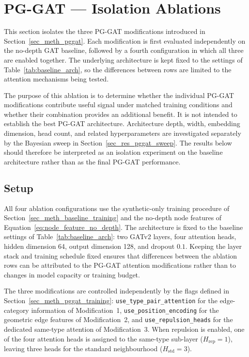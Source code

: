 \section{PG-GAT --- Isolation Ablations}
\label{sec_res_pggat_ablations}

This section isolates the three PG-GAT modifications introduced in
Section~\ref{sec_meth_pggat}.
Each modification is first evaluated independently
on the no-depth GAT baseline,
followed by a fourth configuration in which all three are enabled together.
The underlying architecture is kept fixed to the settings of
Table~\ref{tab:baseline_arch},
so the differences between rows are limited to the attention mechanisms
being tested.

The purpose of this ablation is to determine whether the individual
PG-GAT modifications contribute useful signal under matched training
conditions
and whether their combination provides an additional benefit.
It is not intended to establish the best PG-GAT architecture.
Architecture depth,
width,
embedding dimension,
head count,
and related hyperparameters are investigated separately by the Bayesian
sweep in Section~\ref{sec_res_pggat_sweep}.
The results below should therefore be interpreted as an isolation
experiment on the baseline architecture
rather than as the final PG-GAT performance.

\subsection{Setup}
\label{sec_res_pggat_ablations_setup}

All four ablation configurations use the synthetic-only training
procedure of Section~\ref{sec_meth_baseline_training}
and the no-depth node features of Equation~\eqref{eq:node_feature_no_depth}.
The architecture is fixed to the baseline settings of
Table~\ref{tab:baseline_arch}:
two GATv2 layers,
four attention heads,
hidden dimension 64,
output dimension 128,
and dropout $0.1$.
Keeping the layer stack and training schedule fixed ensures that
differences between the ablation rows can be attributed to the PG-GAT
attention modifications
rather than to changes in model capacity or training budget.

The three modifications are controlled independently by the flags
defined in Section~\ref{sec_meth_pggat_training}:
\texttt{use\_type\_pair\_attention} for the edge-category information
of Modification~1,
\texttt{use\_position\_encoding} for the geometric edge features
of Modification~2,
and \texttt{use\_repulsion\_heads} for the dedicated same-type attention
of Modification~3.
When repulsion is enabled,
one of the four attention heads is assigned to the same-type sub-layer
($H_{\text{rep}}=1$),
leaving three heads for the standard neighbourhood ($H_{\text{std}}=3$).

